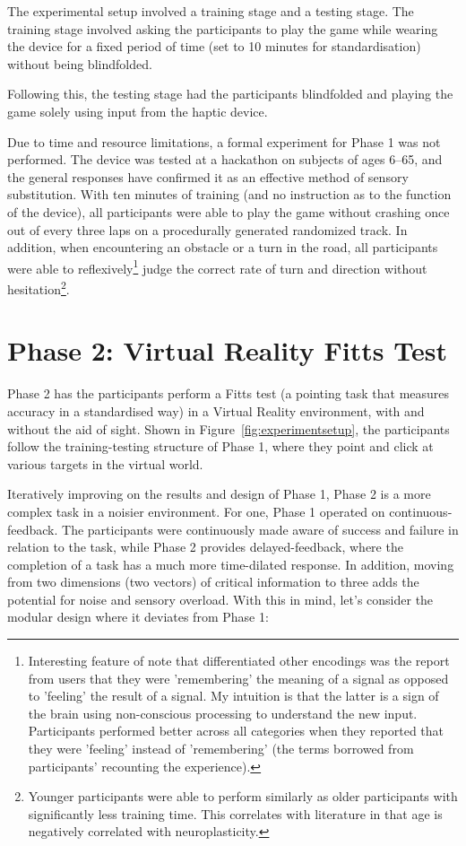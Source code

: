 \documentclass[
12pt, %
oneside, %
english, %
doublespacing, %
headsepline, %
]{MastersDoctoralThesis} %
\begin{document}
The experimental setup involved a training stage and a testing stage. The training stage involved asking the participants to play the game while wearing the device for a fixed period of time (set to 10 minutes for standardisation) without being blindfolded.

Following this, the testing stage had the participants blindfolded and playing the game solely using input from the haptic device.

Due to time and resource limitations, a formal experiment for Phase 1 was not performed. The device was tested at a hackathon on subjects of ages 6--65, and the general responses have confirmed it as an effective method of sensory substitution. With ten minutes of training (and no instruction as to the function of the device), all participants were able to play the game without crashing once out of every three laps on a procedurally generated randomized track. In addition, when encountering an obstacle or a turn in the road, all participants were able to reflexively\footnote{Interesting feature of note that differentiated other encodings was the report from users that they were 'remembering' the meaning of a signal as opposed to 'feeling' the result of a signal. My intuition is that the latter is a sign of the brain using non-conscious processing to understand the new input. Participants performed better across all categories when they reported that they were 'feeling' instead of 'remembering' (the terms borrowed from participants' recounting the experience).} judge the correct rate of turn and direction without hesitation\footnote{Younger participants were able to perform similarly as older participants with significantly less training time. This correlates with literature \parencite{kolb_brain_2011} in that age is negatively correlated with neuroplasticity.}.

\section{Phase 2: Virtual Reality Fitts Test}

Phase 2 has the participants perform a Fitts test (a pointing task that measures accuracy in a standardised way) in a Virtual Reality environment, with and without the aid of sight.
Shown in Figure~\ref{fig:experimentsetup}, the participants follow the training-testing structure of Phase 1, where they point and click at various targets in the virtual world.

Iteratively improving on the results and design of Phase 1, Phase 2 is a more complex task in a noisier environment. For one, Phase 1 operated on continuous-feedback. The participants were continuously made aware of success and failure in relation to the task, while Phase 2 provides delayed-feedback, where the completion of a task has a much more time-dilated response. In addition, moving from two dimensions (two vectors) of critical information to three adds the potential for noise and sensory overload. With this in mind, let's consider the modular design where it deviates from Phase 1:
\end{document}
